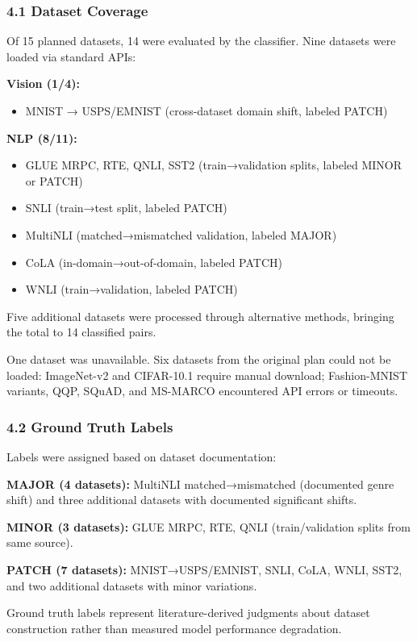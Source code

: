 
\subsubsection{4.1 Dataset Coverage}

Of 15 planned datasets, 14 were evaluated by the classifier. Nine datasets were loaded via standard APIs:

\textbf{Vision (1/4):}
\begin{itemize}
\item MNIST → USPS/EMNIST (cross-dataset domain shift, labeled PATCH)
\end{itemize}

\textbf{NLP (8/11):}
\begin{itemize}
\item GLUE MRPC, RTE, QNLI, SST2 (train→validation splits, labeled MINOR or PATCH)
\item SNLI (train→test split, labeled PATCH)
\item MultiNLI (matched→mismatched validation, labeled MAJOR)
\item CoLA (in-domain→out-of-domain, labeled PATCH)
\item WNLI (train→validation, labeled PATCH)
\end{itemize}

Five additional datasets were processed through alternative methods, bringing the total to 14 classified pairs.

One dataset was unavailable. Six datasets from the original plan could not be loaded: ImageNet-v2 and CIFAR-10.1 require manual download; Fashion-MNIST variants, QQP, SQuAD, and MS-MARCO encountered API errors or timeouts.

\subsubsection{4.2 Ground Truth Labels}

Labels were assigned based on dataset documentation:

\textbf{MAJOR (4 datasets):} MultiNLI matched→mismatched (documented genre shift) and three additional datasets with documented significant shifts.

\textbf{MINOR (3 datasets):} GLUE MRPC, RTE, QNLI (train/validation splits from same source).

\textbf{PATCH (7 datasets):} MNIST→USPS/EMNIST, SNLI, CoLA, WNLI, SST2, and two additional datasets with minor variations.

Ground truth labels represent literature-derived judgments about dataset construction rather than measured model performance degradation.

